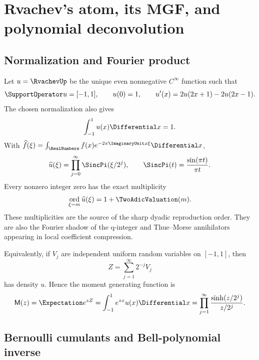 \documentclass[11pt,oneside]{article}
\numberwithin{equation}{section}
\theoremstyle{definition}
\theoremstyle{remark}
\newcommand{\MM}{\mathsf M}
\DeclareMathOperator{\ord}{ord}
\begin{document}
\section{Rvachev's atom, its MGF, and polynomial deconvolution}
\label{sec:foundations}

\subsection{Normalization and Fourier product}

Let $u=\RvachevUp$ be the unique even nonnegative $C^\infty$ function such that
\begin{equation}
 \SupportOperator u=[-1,1],\qquad u(0)=1,\qquad
 u'(x)=2u(2x+1)-2u(2x-1).
 \label{eq:up-dde}
\end{equation}
The chosen normalization also gives
\begin{equation}
 \int_{-1}^{1}u(x)\Differential x=1.
 \label{eq:up-probability}
\end{equation}
With
\(
 \widehat f(\xi)=\int_{\RealNumbers}f(x)e^{-2\pi\ImaginaryUnit x\xi}\Differential x
\),
\begin{equation}
 \widehat u(\xi)=
 \prod_{j=0}^{\infty}\SincPi(\xi/2^j),
 \qquad
 \SincPi(t)=\frac{\sin(\pi t)}{\pi t}.
 \label{eq:fourier-product}
\end{equation}
Every nonzero integer zero has the exact multiplicity
\begin{equation}
 \ord_{\xi=m}\widehat u(\xi)=1+\TwoAdicValuation(m).
 \label{eq:zero-order}
\end{equation}
These multiplicities are the source of the sharp dyadic reproduction order.
They are also the Fourier shadow of the q-integer and Thue--Morse annihilators
appearing in local coefficient compression.

Equivalently, if $V_j$ are independent uniform random variables on $[-1,1]$,
then
\begin{equation}
 Z=\sum_{j=1}^{\infty}2^{-j}V_j
 \label{eq:random-series}
\end{equation}
has density $u$.  Hence the moment generating function is
\begin{equation}
 \MM(z)=\Expectation e^{zZ}
 =\int_{-1}^{1}e^{zx}u(x)\Differential x
 =\prod_{j=1}^{\infty}\frac{\sinh(z/2^j)}{z/2^j}.
 \label{eq:mgf}
\end{equation}

\subsection{Bernoulli cumulants and Bell-polynomial inverse}
\end{document}
